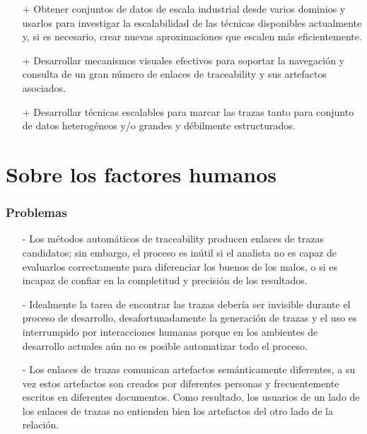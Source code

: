 \documentclass[a4paper,12pt,oneside,spanish]{book}
\begin{document}
\begin{itemize}

\item[+] Obtener conjuntos de datos de escala industrial desde varios dominios y usarlos para investigar la escalabilidad de las técnicas disponibles actualmente y, si es necesario, crear nuevas aproximaciones que escalen más eficientemente.

\item[+] Desarrollar mecanismos visuales efectivos para soportar la navegación y consulta de un gran número de enlaces de traceability y sus artefactos asociados.

\item[+] Desarrollar técnicas escalables para marcar las trazas tanto para conjunto de datos heterogéneos y/o grandes y débilmente estructurados.

\end{itemize}


\section{Sobre los factores humanos}

\subsubsection{Problemas}

\begin{itemize}

\item[-] Los métodos automáticos de traceability producen enlaces de trazas candidatos; sin embargo, el proceso es inútil si el analista no es capaz de evaluarlos correctamente para diferenciar los buenos de los malos, o si es incapaz de confiar en la completitud y precisión de los resultados.

\item[-] Idealmente la tarea de encontrar las trazas debería ser invisible durante el proceso de desarrollo, desafortunadamente la generación de trazas y el uso es interrumpido por interacciones humanas porque en los ambientes de desarrollo actuales aún no es posible automatizar todo el proceso.

\item[-] Los enlaces de trazas comunican artefactos semánticamente diferentes, a su vez estos artefactos son creados por diferentes personas y frecuentemente escritos en diferentes documentos. Como resultado, los usuarios de un lado de los enlaces de trazas no entienden bien los artefactos del otro lado de la relación.

\end{itemize}
\end{document}
